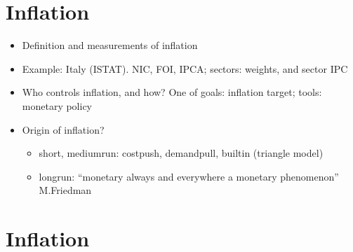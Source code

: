 \documentclass[letterpaper,10pt,english]{jupyterBook}
\begin{document}
\chapter{Inflation}
\label{\detokenize{ch/inflation:inflation}}\label{\detokenize{ch/inflation:fin-edu-inflation}}\label{\detokenize{ch/inflation::doc}}\begin{itemize}
\item {} 
\sphinxAtStartPar
Definition and measurements of inflation

\item {} 
\sphinxAtStartPar
Example: Italy (ISTAT). NIC, FOI, IPCA; sectors: weights, and sector IPC

\item {} 
\sphinxAtStartPar
Who controls inflation, and how? One of {\hyperref[\detokenize{ch/actors:fin-edu-actors-banks-cb}]{}} goals: inflation target; tools: monetary policy

\item {} 
\sphinxAtStartPar
Origin of inflation?
\begin{itemize}
\item {} 
\sphinxAtStartPar
short\sphinxhyphen{}, medium\sphinxhyphen{}run: cost\sphinxhyphen{}push, demand\sphinxhyphen{}pull, built\sphinxhyphen{}in (triangle model)

\item {} 
\sphinxAtStartPar
long\sphinxhyphen{}run: “monetary always and everywhere a monetary phenomenon” M.Friedman

\end{itemize}

\end{itemize}

\sphinxstepscope


\chapter{Inflation}
\label{\detokenize{code/notebooks/inflation:inflation}}\label{\detokenize{code/notebooks/inflation::doc}}
\end{document}
